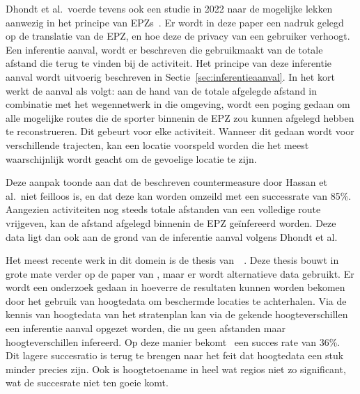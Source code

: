 Dhondt et al.\ voerde tevens ook een studie in 2022 naar de mogelijke lekken
aanwezig in het principe van
\acp{EPZ}~\cite{Dhondt_Pochat_Voulimeneas_Joosen_Volckaert_2022}. Er wordt in
deze paper een nadruk gelegd op de translatie van de \ac{EPZ}, en hoe deze de
privacy van een gebruiker verhoogt. Een inferentie aanval, wordt er beschreven
die gebruikmaakt van de totale afstand die terug te vinden bij de activiteit.
Het principe van deze inferentie aanval wordt uitvoerig beschreven in
Sectie~\ref{sec:inferentieaanval}. In het kort werkt de aanval als volgt: aan
de hand van de totale afgelegde afstand in combinatie met het wegennetwerk in
die omgeving, wordt een poging gedaan om alle mogelijke routes die de sporter
binnenin de \ac{EPZ} zou kunnen afgelegd hebben te reconstrueren. Dit gebeurt
voor elke activiteit. Wanneer dit gedaan wordt voor verschillende trajecten,
kan een locatie voorspeld worden die het meest waarschijnlijk wordt geacht om
de gevoelige locatie te zijn.

Deze aanpak toonde aan dat de beschreven countermeasure door Hassan et al.\
niet feilloos is, en dat deze kan worden omzeild met een successrate van 85\%.
Aangezien activiteiten nog steeds totale afstanden van een volledige route
vrijgeven, kan de afstand afgelegd binnenin de EPZ geïnfereerd worden. Deze
data ligt dan ook aan de grond van de inferentie aanval volgens Dhondt et al.

Het meest recente werk in dit domein is de thesis
van~\citeauthor{Verdonck_2022}~\cite{Verdonck_2022}. Deze thesis bouwt in grote
mate verder op de paper van
\citeauthor{Dhondt_Pochat_Voulimeneas_Joosen_Volckaert_2022}, maar er wordt
alternatieve data gebruikt. Er wordt een onderzoek gedaan in hoeverre de
resultaten kunnen worden bekomen door het gebruik van hoogtedata om beschermde
locaties te achterhalen. Via de kennis van hoogtedata van het stratenplan kan
via de gekende hoogteverschillen een inferentie aanval opgezet worden, die nu
geen afstanden maar hoogteverschillen infereerd. Op deze manier
bekomt~\citeauthor{Verdonck_2022} een succes rate van 36\%. Dit lagere
succesratio is terug te brengen naar het feit dat hoogtedata een stuk minder
precies zijn. Ook is hoogtetoename in heel wat regios niet zo significant, wat
de succesrate niet ten goeie komt.